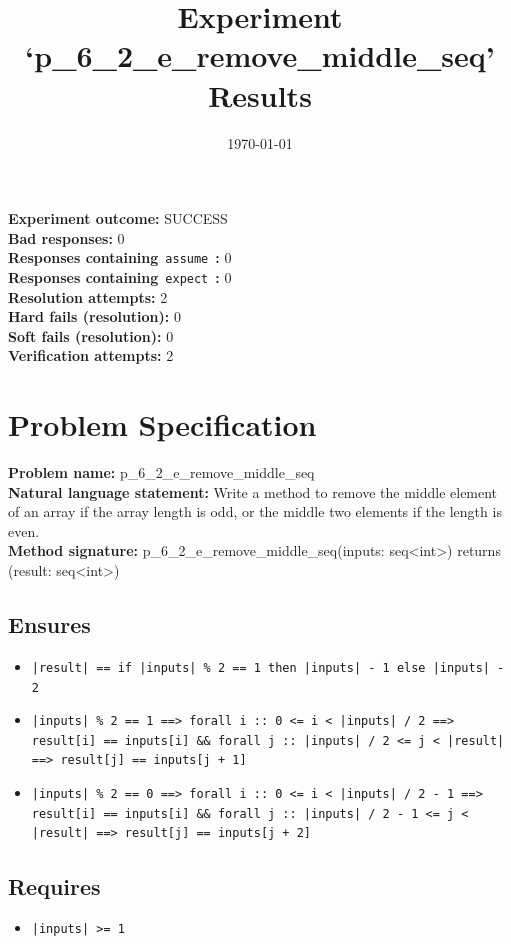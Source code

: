 \documentclass{article}
\begin{document}
\title{Experiment `p\_6\_2\_e\_remove\_middle\_seq' Results}
\author{\today}
\date{}
\maketitle
\textbf{Experiment outcome: }SUCCESS
\\\textbf{Bad responses: }0
\\\textbf{Responses containing}~\texttt{assume}~\textbf{: }0
\\\textbf{Responses containing}~\texttt{expect}~\textbf{: }0
\\\textbf{Resolution attempts: }2
\\\textbf{Hard fails (resolution): }0
\\\textbf{Soft fails (resolution): }0
\\\textbf{Verification attempts: }2
\section*{Problem Specification}
\textbf{Problem name: }p\_6\_2\_e\_remove\_middle\_seq
\\\textbf{Natural language statement: }Write a method to remove the middle element of an array if the array length is odd, or the middle two elements if the length is even.
\\\textbf{Method signature: }p\_6\_2\_e\_remove\_middle\_seq(inputs: seq<int>) returns (result: seq<int>)
\subsection*{Ensures}
\begin{itemize}
\item \texttt{|result| == if |inputs| \% 2 == 1 then |inputs| - 1 else |inputs| - 2}
\item \texttt{|inputs| \% 2 == 1 ==> forall i :: 0 <= i < |inputs| / 2 ==> result[i] == inputs[i] \&\& forall j :: |inputs| / 2 <= j < |result| ==> result[j] == inputs[j + 1]}
\item \texttt{|inputs| \% 2 == 0 ==> forall i :: 0 <= i < |inputs| / 2 - 1 ==> result[i] == inputs[i] \&\& forall j :: |inputs| / 2 - 1 <= j < |result| ==> result[j] == inputs[j + 2]}
\end{itemize}
\subsection*{Requires}
\begin{itemize}
\item \texttt{|inputs| >= 1}
\end{itemize}
\clearpage
\end{document}
